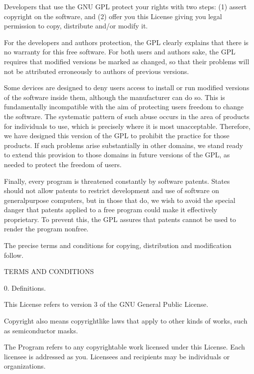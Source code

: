 \documentclass[a4paper,10pt,english]{sphinxmanual}
\begin{document}
\begin{sphinxVerbatim}[commandchars=\\\{\}]
  Developers that use the GNU GPL protect your rights with two steps:
(1) assert copyright on the software, and (2) offer you this License
giving you legal permission to copy, distribute and/or modify it.

  For the developers\PYGZsq{} and authors\PYGZsq{} protection, the GPL clearly explains
that there is no warranty for this free software.  For both users\PYGZsq{} and
authors\PYGZsq{} sake, the GPL requires that modified versions be marked as
changed, so that their problems will not be attributed erroneously to
authors of previous versions.

  Some devices are designed to deny users access to install or run
modified versions of the software inside them, although the manufacturer
can do so.  This is fundamentally incompatible with the aim of
protecting users\PYGZsq{} freedom to change the software.  The systematic
pattern of such abuse occurs in the area of products for individuals to
use, which is precisely where it is most unacceptable.  Therefore, we
have designed this version of the GPL to prohibit the practice for those
products.  If such problems arise substantially in other domains, we
stand ready to extend this provision to those domains in future versions
of the GPL, as needed to protect the freedom of users.

  Finally, every program is threatened constantly by software patents.
States should not allow patents to restrict development and use of
software on general\PYGZhy{}purpose computers, but in those that do, we wish to
avoid the special danger that patents applied to a free program could
make it effectively proprietary.  To prevent this, the GPL assures that
patents cannot be used to render the program non\PYGZhy{}free.

  The precise terms and conditions for copying, distribution and
modification follow.

                       TERMS AND CONDITIONS

  0. Definitions.

  \PYGZdq{}This License\PYGZdq{} refers to version 3 of the GNU General Public License.

  \PYGZdq{}Copyright\PYGZdq{} also means copyright\PYGZhy{}like laws that apply to other kinds of
works, such as semiconductor masks.

  \PYGZdq{}The Program\PYGZdq{} refers to any copyrightable work licensed under this
License.  Each licensee is addressed as \PYGZdq{}you\PYGZdq{}.  \PYGZdq{}Licensees\PYGZdq{} and
\PYGZdq{}recipients\PYGZdq{} may be individuals or organizations.


\end{sphinxVerbatim}
\end{document}
